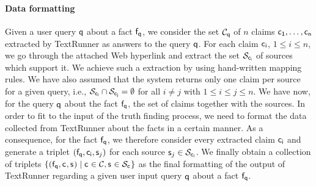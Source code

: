 \paragraph*{Data formatting}
Given a user query $\mathsf{q}$ about a fact $\mathsf{f}_{\mathsf{q}}$, we consider the set $\mathcal{C}_{\mathsf{q}}$ 
of $n$ claims $\mathsf{c_{1}}, \ldots, \mathsf{c_{n}}$ extracted by TextRunner as answers to the query $\mathsf{q}$.
For each claim $\mathsf{c_{i}}$, $1\leq i\leq n$, we go through the attached Web hyperlink and extract the set
$\mathcal{S}_{\mathsf{c_{i}}}$ of sources which support it. We achieve such a extraction by using hand-written mapping 
rules. We have also assumed that the system returns only one claim per source for a given query, i.e., $\mathcal{S}_{\mathsf{c_{i}}}
\cap \mathcal{S}_{\mathsf{c_{j}}}=\emptyset$ for all $i\neq j$ with $1\leq i\leq j\leq n$. We have now, for the query
$\mathsf{q}$ about the fact $\mathsf{f}_{\mathsf{q}}$, the set of claims together with the sources. In order to fit to 
the input of the truth finding process, we need to format the data collected from TextRunner about the 
facts in a certain manner. As a consequence, for the fact $\mathsf{f}_{\mathsf{q}}$, we therefore consider every extracted 
claim $\mathsf{c_{i}}$ and generate a triplet $(\mathsf{f}_{\mathsf{q}}, \mathsf{c_{i}}, \mathsf{s}_{j})$ for each source $\mathsf{s}_{j}\in \mathcal{S}_{\mathsf{c_{i}}}$.
We finally obtain a collection of triplets $\{(\mathsf{f}_{\mathsf{q}}, \mathsf{c_{}}, \mathsf{s}_{})\mid \mathsf{c_{}}\in \mathcal{C}, \mathsf{s}_{} \in \mathcal{S}_{\mathsf{c_{}}}\}$ 
as the final formatting of the output of TextRunner regarding a given user input query $\mathsf{q}$ about a fact $\mathsf{f}_{\mathsf{q}}$. 



